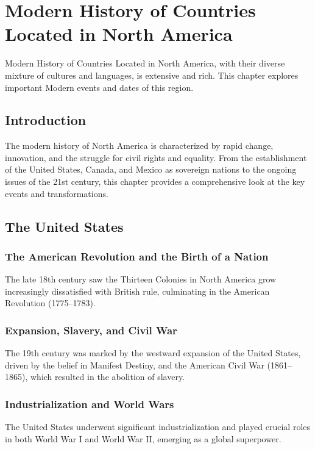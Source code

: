 \documentclass[a4paper,12pt]{book}
\begin{document}
\chapter{Modern History of Countries Located in North America}
\label{ch:modern-history-north-america}

Modern History of Countries Located in North America, with their diverse mixture of cultures and languages, is extensive and rich. This chapter explores important Modern events and dates of this region.

\section{Introduction}
\label{sec:introduction-north-america-modern}
The modern history of North America is characterized by rapid change, innovation, and the struggle for civil rights and equality. From the establishment of the United States, Canada, and Mexico as sovereign nations to the ongoing issues of the 21st century, this chapter provides a comprehensive look at the key events and transformations.

\section{The United States}
\label{sec:united-states}

\subsection{The American Revolution and the Birth of a Nation}
The late 18th century saw the Thirteen Colonies in North America grow increasingly dissatisfied with British rule, culminating in the American Revolution (1775–1783).

\subsection{Expansion, Slavery, and Civil War}
The 19th century was marked by the westward expansion of the United States, driven by the belief in Manifest Destiny, and the American Civil War (1861–1865), which resulted in the abolition of slavery.

\subsection{Industrialization and World Wars}
The United States underwent significant industrialization and played crucial roles in both World War I and World War II, emerging as a global superpower.
\end{document}
